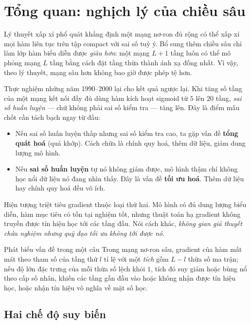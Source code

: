 \section{Tổng quan: nghịch lý của chiều sâu}
\label{sec:tongquan}

Lý thuyết xấp xỉ phổ quát khẳng định một mạng nơ-ron đủ rộng có thể xấp xỉ mọi
hàm liên tục trên tập compact với sai số tuỳ ý. Bổ sung thêm chiều sâu chỉ làm
lớp hàm biểu diễn được \emph{giàu hơn}: một mạng $L+1$ tầng luôn có thể mô phỏng
mạng $L$ tầng bằng cách đặt tầng thừa thành ánh xạ đồng nhất. Vì vậy, theo lý
thuyết, mạng sâu hơn không bao giờ được phép tệ hơn.

Thực nghiệm những năm 1990--2000 lại cho kết quả ngược lại. Khi tăng số tầng của
một mạng kết nối đầy đủ dùng hàm kích hoạt sigmoid từ $5$ lên $20$ tầng,
\emph{sai số huấn luyện} --- chứ không phải sai số kiểm tra --- tăng lên. Đây là
điểm mấu chốt cần tách bạch ngay từ đầu:

\begin{itemize}[leftmargin=*, itemsep=2pt]
  \item Nếu sai số huấn luyện thấp nhưng sai số kiểm tra cao, ta gặp vấn đề
    \textbf{tổng quát hoá} (quá khớp). Cách chữa là chính quy hoá, thêm dữ liệu,
    giảm dung lượng mô hình.
  \item Nếu \textbf{sai số huấn luyện} tự nó không giảm được, mô hình thậm chí
    không học nổi dữ liệu nó đang nhìn thấy. Đây là vấn đề \textbf{tối ưu hoá}.
    Thêm dữ liệu hay chính quy hoá đều vô ích.
\end{itemize}

Hiện tượng triệt tiêu gradient thuộc loại thứ hai. Mô hình có đủ dung lượng biểu
diễn, hàm mục tiêu có tồn tại nghiệm tốt, nhưng thuật toán hạ gradient không
truyền được tín hiệu học tới các tầng đầu. Nói cách khác, \emph{không gian giả
thuyết chứa nghiệm nhưng quỹ đạo tối ưu không tới được nó}.

\begin{infobox}{Phát biểu vấn đề trong một câu}
Trong mạng nơ-ron sâu, gradient của hàm mất mát theo tham số của tầng thứ $l$
tỉ lệ với một \emph{tích} gồm $L-l$ thừa số ma trận; nếu độ lớn đặc trưng của
mỗi thừa số lệch khỏi $1$, tích đó suy giảm hoặc bùng nổ theo cấp số nhân, khiến
các tầng gần đầu vào hoặc không nhận được tín hiệu học, hoặc nhận tín hiệu vô
nghĩa về mặt số học.
\end{infobox}

\subsection{Hai chế độ suy biến}

